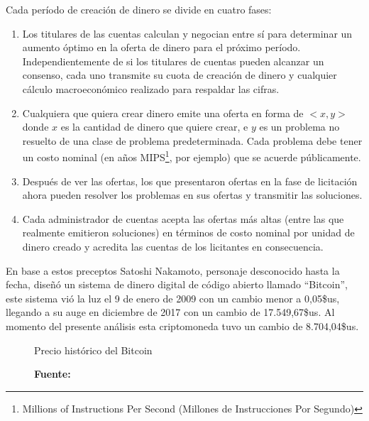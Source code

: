 \documentclass[../main/main.tex]{subfiles}
\begin{document}
  Cada período de creación de dinero se divide en cuatro fases:

  \begin{enumerate}
    \item Los titulares de las cuentas calculan y negocian entre sí para determinar un aumento óptimo en la oferta de dinero para el próximo período. Independientemente de si los titulares de cuentas pueden alcanzar un consenso, cada uno transmite su cuota de creación de dinero y cualquier cálculo macroeconómico realizado para respaldar las cifras.
    \item Cualquiera que quiera crear dinero emite una oferta en forma de $<x, y>$ donde $x$ es la cantidad de dinero que quiere crear, e $y$ es un problema no resuelto de una clase de problema predeterminada. Cada problema debe tener un costo nominal (en años MIPS\footnote{Millions of Instructions Per Second (Millones de Instrucciones Por Segundo)}, por ejemplo) que se acuerde públicamente.
    \item Después de ver las ofertas, los que presentaron ofertas en la fase de licitación ahora pueden resolver los problemas en sus ofertas y transmitir las soluciones.
    \item Cada administrador de cuentas acepta las ofertas más altas (entre las que realmente emitieron soluciones) en términos de costo nominal por unidad de dinero creado y acredita las cuentas de los licitantes en consecuencia.
  \end{enumerate}

  En base a estos preceptos Satoshi Nakamoto, personaje desconocido hasta la fecha, diseñó un sistema de dinero digital de código abierto llamado ``Bitcoin'', este sistema vió la luz el 9 de enero de 2009 con un cambio menor a 0,05\$us, llegando a su auge en diciembre de 2017 con un cambio de 17.549,67\$us. Al momento del presente análisis esta criptomoneda tuvo un cambio de 8.704,04\$us.

  \begin{figure}[H]
    \centering
    \caption{Precio histórico del Bitcoin}
    \newcommand\csvfile{../inc/marco_teorico/bitcoin_price.csv}
    \pgfplotstableread[col sep=comma]{\csvfile}\datatable
    \caption*{\textbf{Fuente:} \cite{web:bitstamp}}
  \end{figure}

  
\end{document}
